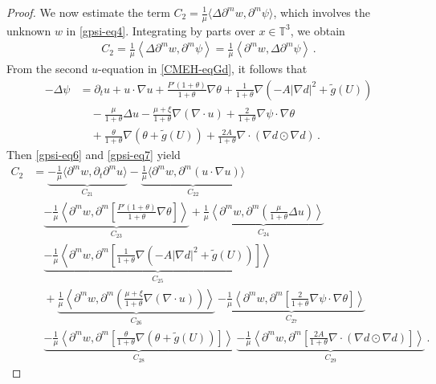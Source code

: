 \documentclass[reqno,11pt]{amsart}
\numberwithin{equation}{section}
\def\p{\partial}
\def\no{\nonumber}
\begin{document}
\begin{proof}
We now estimate the term $C_2 = \frac{1}{\mu} \langle \Delta \p^m w, \p^m \psi \rangle$, which involves the unknown $w$ in \eqref{gpsi-eq4}. Integrating by parts over $x\in \mathbb{T}^3$, we obtain
\begin{equation}\label{gpsi-eq6}
\begin{aligned}
C_2=\frac{1}{\mu} \left\langle \Delta \partial^m w, \partial^m \psi \right\rangle=\frac{1}{\mu} \left\langle  \partial^m w, \Delta\partial^m \psi \right\rangle  \,.
\end{aligned}
\end{equation}
From the second $u$-equation in \eqref{CMEH-eqGd}, it follows that
\begin{align}\label{gpsi-eq7}
\no -\Delta \psi &= \partial_t u + u \cdot \nabla u + \frac{P'(1+\theta)}{1+\theta} \nabla \theta + \frac{1}{1+\theta} \nabla \left(-A |\nabla d|^2 + \tilde{g}(U)\right) \\
\no & \quad -\frac{\mu}{1+\theta} \Delta u - \frac{\mu+\xi}{1+\theta} \nabla (\nabla \cdot u) + \frac{2}{1+\theta} \nabla {\psi} \cdot \nabla \theta \\
& \quad + \frac{\theta}{1+\theta} \nabla \left(\theta + \tilde{g}(U)\right) + \frac{2A}{1+\theta} \nabla \cdot \left( \nabla d \odot \nabla d \right)
 \,.
\end{align}
 Then \eqref{gpsi-eq6} and \eqref{gpsi-eq7} yield
 \begin{equation}\label{gpsi-eq8}
\begin{aligned}
C_2 & = \underset{ C_{21} }{ \underbrace{ - \frac{1}{\mu} \langle \p^m w, \p_t \p^m u \rangle }} - \underset{ C_{22} }{ \underbrace{ \frac{1}{\mu} \langle \p^m w, \p^m ( u \cdot \nabla u ) \rangle}} \\
& \quad \underset{ C_{23} }{ \underbrace{ - \frac{1}{\mu} \left\langle \partial^m w, \partial^m \left[ \frac{ P' ( 1 + \theta ) }{ 1 + \theta } \nabla \theta \right] \right\rangle }} + \underset{ C_{24} }{ \underbrace{ \frac{1}{\mu} \left\langle \partial^m w, \partial^m \left( \frac{\mu}{ 1+\theta } \Delta u \right) \right\rangle }} \\
& \quad \underset{ C_{25} }{ \underbrace{ - \frac{1}{\mu} \left\langle \partial^m w, \partial^m \left[ \frac{1}{ 1+\theta } \nabla \left( - A | \nabla d |^2 + \tilde{g} (U) \right) \right] \right\rangle }} \\
& \quad + \underset{ C_{26} }{ \underbrace{ \frac{1}{\mu} \left\langle \partial^m w, \partial^m \left( \frac{ \mu + \xi }{ 1 + \theta } \nabla ( \nabla \cdot u ) \right) \right\rangle }} \ \underset{ C_{27} }{ \underbrace{ - \frac{1}{\mu} \left\langle \partial^m w, \partial^m \left[ \frac{2}{ 1 + \theta } \nabla \psi \cdot \nabla \theta \right] \right\rangle }} \\
& \quad \underset{ C_{28} }{ \underbrace{ - \frac{1}{\mu} \left\langle \partial^m w, \partial^m \left[ \frac{\theta}{1+\theta} \nabla \left( \theta + \tilde{g} (U) \right) \right] \right\rangle }} \ \underset{ C_{29} }{ \underbrace{ - \frac{1}{\mu} \left\langle \partial^m w, \partial^m \left[ \frac{2A}{ 1 + \theta } \nabla \cdot \left( \nabla d \odot \nabla d \right) \right] \right\rangle }} \,.
\end{aligned}
\end{equation}


\end{proof}
\end{document}

